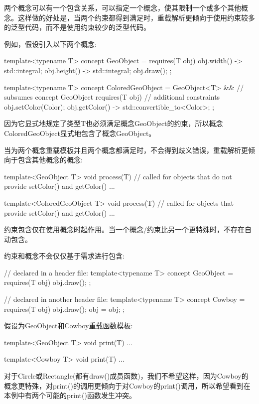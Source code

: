 
两个概念可以有一个包含关系，可以指定一个概念，使其限制一个或多个其他概念。这样做的好处是，当两个约束都得到满足时，重载解析更倾向于使用约束较多的泛型代码，而不是使用约束较少的泛型代码。

例如，假设引入以下两个概念:

\begin{cpp}
template<typename T>
concept GeoObject = requires(T obj) {
	{ obj.width() } -> std::integral;
	{ obj.height() } -> std::integral;
	obj.draw();
};

template<typename T>
concept ColoredGeoObject =
	GeoObject<T> && // subsumes concept GeoObject
	requires(T obj) { // additional constraints
		obj.setColor(Color{});
		{ obj.getColor() } -> std::convertible_to<Color>;
	};
\end{cpp}

因为它显式地规定了类型T也必须满足概念GeoObject的约束，所以概念ColoredGeoObject显式地包含了概念GeoObject。

当为两个概念重载模板并且两个概念都满足时，不会得到歧义错误，重载解析更倾向于包含其他概念的概念:

\begin{cpp}
template<GeoObject T>
void process(T) // called for objects that do not provide setColor() and getColor()
{
	...
}

template<ColoredGeoObject T>
void process(T) // called for objects that provide setColor() and getColor()
{
	...
}
\end{cpp}

约束包含仅在使用概念时起作用。当一个概念/约束比另一个更特殊时，不存在自动包含。

约束和概念不会仅仅基于需求进行包含:

\begin{cpp}
// declared in a header file:
template<typename T>
concept GeoObject = requires(T obj) {
						obj.draw();
					};

// declared in another header file:
template<typename T>
concept Cowboy = requires(T obj) {
					obj.draw();
					obj = obj;
				};
\end{cpp}

假设为GeoObject和Cowboy重载函数模板:

\begin{cpp}
template<GeoObject T>
void print(T) {
	...
}

template<Cowboy T>
void print(T) {
	...
}
\end{cpp}

对于Circle或Rectangle(都有draw()成员函数)，我们不希望这样，因为Cowboy的概念更特殊，对print()的调用更倾向于对Cowboy的print()调用，所以希望看到在本例中有两个可能的print()函数发生冲突。

